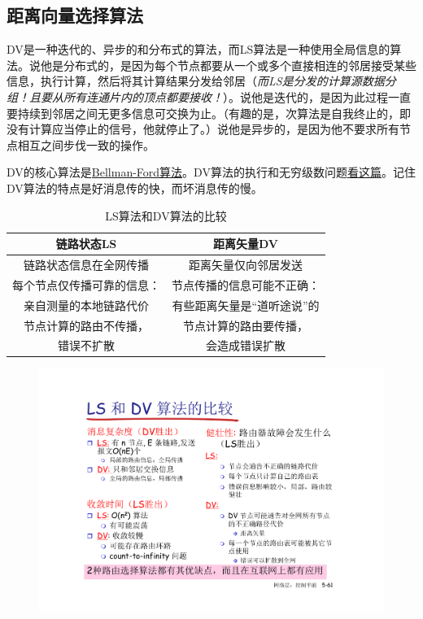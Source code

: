 \documentclass[]{report}
\begin{document}
		\subsection{距离向量选择算法}
		DV是一种迭代的、异步的和分布式的算法，而LS算法是一种使用全局信息的算法。说他是分布式的，是因为每个节点都要从一个或多个直接相连的邻居接受某些信息，执行计算，然后将其计算结果分发给邻居（\textit{而LS是分发的计算源数据分组！且要从所有连通片内的顶点都要接收！}）。说他是迭代的，是因为此过程一直要持续到邻居之间无更多信息可交换为止。（有趣的是，次算法是自我终止的，即没有计算应当停止的信号，他就停止了。）说他是异步的，是因为他不要求所有节点相互之间步伐一致的操作。\par
		DV的核心算法是\href{https://www.jianshu.com/p/b876fe9b2338}{Bellman-Ford算法}。DV算法的执行和无穷级数问题\href{https://blog.csdn.net/iteye_3753/article/details/82436672}{看这篇}。记住DV算法的特点是好消息传的快，而坏消息传的慢。
		\begin{table}[h]
			\centering
			\caption{LS算法和DV算法的比较}
			\begin{tabular}{cc}
				\toprule
				链路状态LS&距离矢量DV\\
				\midrule
				链路状态信息在全网传播&距离矢量仅向邻居发送\\
				每个节点仅传播可靠的信息：&节点传播的信息可能不正确：\\
				亲自测量的本地链路代价&有些距离矢量是“道听途说”的\\
				节点计算的路由不传播，&节点计算的路由要传播，\\
				错误不扩散&会造成错误扩散\\
				\bottomrule
			\end{tabular}
		\end{table}
		\begin{figure}
			\centering
			\begin{minipage}{40em}
				\centering
				\includegraphics[scale = 0.4]{images/LSvsDV.pdf}
			\end{minipage}
		\end{figure}
\end{document}
